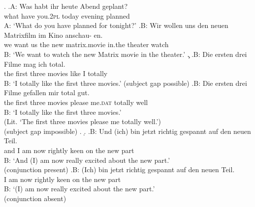 \ex.\label{ex:item.conjunction}
\ag.A: Was habt ihr heute Abend geplant?\\
{} what have you.\textsc{2pl} today evening planned\\
A: `What do you have planned for tonight?'
\bg.B: Wir wollen uns den neuen Matrixfilm im Kino anschau- \newline en.\\
{} we want us the new matrix.movie in.the theater watch\\
\vspace{-\baselineskip}
B: `We want to watch the new Matrix movie in the theater.\phantom{B::}'
\c.\label{ex:item.conjunction.sg}
\ag.\label{ex:item.conjunction.sg.poss}B: Die ersten drei Filme mag ich total.\\
{} the first three movies like I totally\\
B: `I totally like the first three movies.' \hfill (subject gap possible)
\bg.\label{ex:item.conjunction.sg.imposs}B: Die ersten drei Filme gefallen mir total gut.\\
{} the first three movies please me.\textsc{dat} totally well\\
B: `I totally like the first three movies.' \\(Lit. `The first three movies please me totally well.') \\ \phantom{.}\hfill (subject gap impossible)
\z.
\d.\label{ex:item.conjunction.target}
\ag.\label{ex:item.conjunction.target.conj}B: Und (ich) bin jetzt  richtig gespannt auf den neuen Teil.\\
{} and I am now rightly keen on the new part\\
B: `And (I) am now really excited about the new part.' \\\phantom{.}\hfill(conjunction present)
\bg.\label{ex:item.conjunction.target.noconj}B: (Ich) bin jetzt  richtig gespannt auf den neuen Teil.\\
{} I am now rightly keen on the new part\\
B: `(I) am now really excited about the new part.'\\\phantom{.}\hfill(conjunction absent)

